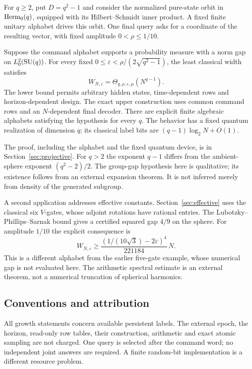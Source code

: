 For $q\ge2$, put $D=q^2-1$ and consider the normalized pure-state orbit
in $\operatorname{Herm}_0(q)$, equipped with its Hilbert--Schmidt inner product.
A fixed finite unitary alphabet drives this orbit. One final query asks
for a coordinate of the resulting vector, with fixed amplitude
$0<\rho\le1/10$.
\begin{theorem}\label{thm:main}
Suppose the command alphabet supports a probability measure with a norm
gap on $L^2_0(\operatorname{SU}(q))$. For every fixed
$0\le\varepsilon<\rho/(2\sqrt{q^2-1})$, the least classical width satisfies
\begin{equation}\label{eq:headline}
 W_{N,\varepsilon}=\Theta_{q,\rho,\varepsilon,\mu}(N^{q-1}).
\end{equation}
The lower bound permits arbitrary hidden states, time-dependent rows and
horizon-dependent design. The exact upper construction uses common
command rows and an $N$-dependent final decoder. There are explicit finite
algebraic alphabets satisfying the hypothesis for every $q$. The behavior
has a fixed quantum realization of dimension $q$; its classical label
bits are $(q-1)\log_2 N+O(1)$.
\end{theorem}
The proof, including the alphabet and the fixed quantum device, is in
Section~\ref{sec:projective}. For $q>2$ the exponent $q-1$ differs from
the ambient-sphere exponent $(q^2-2)/2$. The group-gap hypothesis here is
qualitative; its existence follows from an external expansion theorem.
It is not inferred merely from density of the generated subgroup.

A second application addresses effective constants. Section~\ref{sec:effective}
uses the classical six $V$-gates, whose adjoint rotations have rational
entries. The Lubotzky--Phillips--Sarnak bound gives a certified squared
gap $4/9$ on the sphere. For amplitude $1/10$ the explicit consequence is
\begin{equation}\label{eq:intro-effective}
 W_{N,\varepsilon}\ge
 \frac{(1/(10\sqrt3)-2\varepsilon)^4}{221184}\,N.
\end{equation}
This is a different alphabet from the earlier five-gate example, whose
numerical gap is not evaluated here. The arithmetic spectral estimate is
an external theorem, not a numerical truncation of spherical harmonics.

\subsection{Conventions and attribution}
All growth statements concern available persistent labels. The external
epoch, the horizon, read-only row tables, their construction, arithmetic
and exact atomic sampling are not charged. One query is selected after
the command word; no independent joint answers are required. A finite
random-bit implementation is a different resource problem.


